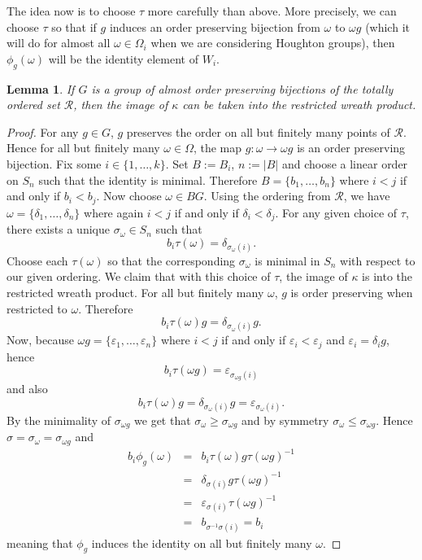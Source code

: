 \documentclass[11pt,a4paper]{amsart}
\renewcommand{\epsilon}{\varepsilon}
\newtheorem{lemma}[theorem]{Lemma}
\theoremstyle{definition}
\theoremstyle{remark}
\newcommand{\Ra}{\mathcal{R}}
\begin{document}
\medskip

The idea now is to choose $\tau$ more carefully than above. More precisely, we can choose $\tau$ so that if $g$ induces an order preserving bijection from $\omega$ to $\omega g$ (which it will do for almost all $\omega\in \Omega_i$ when we are considering Houghton groups), then $\phi_g(\omega)$ will be the identity element of $W_i$.

\begin{lemma}
	\label{restricted}
If $G$ is a group of almost order preserving bijections of the totally ordered set $\Ra$, then the image of $\kappa$ can be taken into the restricted wreath product.
\end{lemma}
\begin{proof}
For any $g \in G$, $g$ preserves the order on all but finitely many points of $\Ra$. Hence for all but finitely many $\omega \in \Omega$, the map $g:\omega \to \omega g$ is an order preserving bijection. Fix some $i\in \{1, \ldots, k\}$. Set $B:=B_i$, $n:=|B|$ and choose a linear order on $S_{n}$ such that the identity is minimal. Therefore $B=\{b_1, \ldots, b_n\}$ where $i<j$ if and only if $b_i<b_j$. Now choose $\omega \in BG$. Using the ordering from $\Ra$, we have $\omega=\{\delta_1, \ldots, \delta_n\}$ where again $i<j$ if and only if $\delta_i<\delta_j$. For any given choice of $\tau$, there exists a unique $\sigma_\omega\in S_n$ such that
$$b_i\tau(\omega)=\delta_{\sigma_\omega(i)}.$$
Choose each $\tau(\omega)$ so that the corresponding $\sigma_\omega$ is minimal in $S_n$ with respect to our given ordering. We claim that with this choice of $\tau$, the image of $\kappa$ is into the restricted wreath product. For all but finitely many $\omega$, $g$ is order preserving when restricted to $\omega$. Therefore
$$b_i\tau(\omega)g=\delta_{\sigma_\omega(i)}g.$$
Now, because $\omega g=\{\epsilon_1, \ldots, \epsilon_n\}$ where $i<j$ if and only if $\epsilon_i<\epsilon_j$ and $\epsilon_i=\delta_i g$, hence
$$b_i\tau(\omega g)=\epsilon_{\sigma_{\omega g}(i)}$$
and also 
$$b_i\tau(\omega)g=\delta_{\sigma_\omega(i)}g=\epsilon_{\sigma_{\omega}(i)}.$$
By the minimality of $\sigma_{\omega g}$ we get that $\sigma_\omega\ge \sigma_{\omega g}$ and by symmetry $\sigma_\omega\le \sigma_{\omega g}$. Hence $\sigma=\sigma_\omega=\sigma_{\omega g}$ and
$$\begin{array}{rcl}
b_i\phi_g(\omega)&=&b_i\tau(\omega)g\tau(\omega g)^{-1}\\
&=&\delta_{\sigma(i)}g\tau(\omega g)^{-1}\\
&=&\epsilon_{\sigma(i)}\tau(\omega g)^{-1}\\
&=&b_{\sigma^{-1}\sigma(i)}=b_i
\end{array}$$
meaning that $\phi_g$ induces the identity on all but finitely many $\omega$.
\end{proof}
\end{document}
